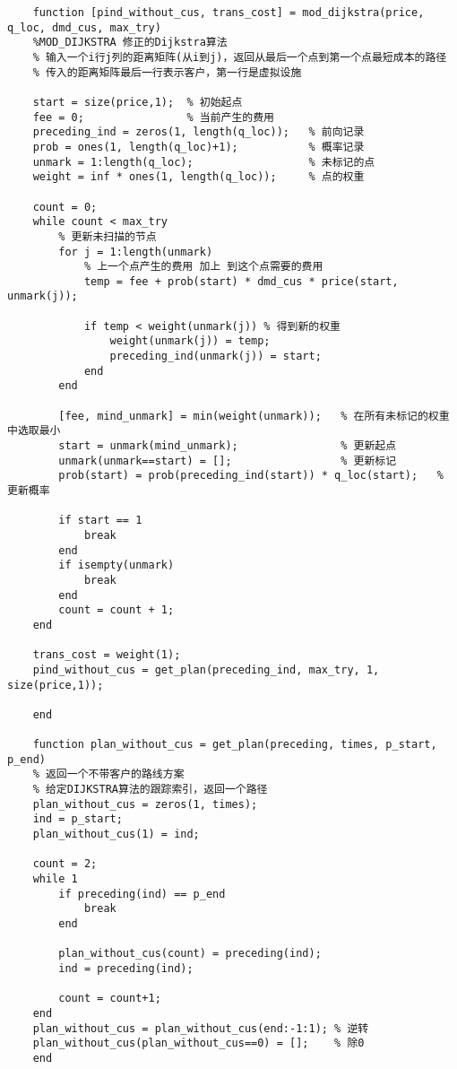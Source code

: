 {\begin{lstlisting}
    function [pind_without_cus, trans_cost] = mod_dijkstra(price, q_loc, dmd_cus, max_try)
    %MOD_DIJKSTRA 修正的Dijkstra算法
    % 输入一个i行j列的距离矩阵(从i到j)，返回从最后一个点到第一个点最短成本的路径
    % 传入的距离矩阵最后一行表示客户，第一行是虚拟设施

    start = size(price,1);  % 初始起点
    fee = 0;                % 当前产生的费用
    preceding_ind = zeros(1, length(q_loc));   % 前向记录
    prob = ones(1, length(q_loc)+1);           % 概率记录
    unmark = 1:length(q_loc);                  % 未标记的点
    weight = inf * ones(1, length(q_loc));     % 点的权重

    count = 0;
    while count < max_try
        % 更新未扫描的节点
        for j = 1:length(unmark)
            % 上一个点产生的费用 加上 到这个点需要的费用
            temp = fee + prob(start) * dmd_cus * price(start, unmark(j));

            if temp < weight(unmark(j)) % 得到新的权重
                weight(unmark(j)) = temp;
                preceding_ind(unmark(j)) = start; 
            end
        end

        [fee, mind_unmark] = min(weight(unmark));   % 在所有未标记的权重中选取最小
        start = unmark(mind_unmark);                % 更新起点
        unmark(unmark==start) = [];                 % 更新标记
        prob(start) = prob(preceding_ind(start)) * q_loc(start);   % 更新概率
        
        if start == 1
            break
        end
        if isempty(unmark)
            break
        end
        count = count + 1;
    end

    trans_cost = weight(1);
    pind_without_cus = get_plan(preceding_ind, max_try, 1, size(price,1));

    end

    function plan_without_cus = get_plan(preceding, times, p_start, p_end)
    % 返回一个不带客户的路线方案
    % 给定DIJKSTRA算法的跟踪索引，返回一个路径
    plan_without_cus = zeros(1, times);
    ind = p_start;
    plan_without_cus(1) = ind;

    count = 2;
    while 1
        if preceding(ind) == p_end
            break
        end

        plan_without_cus(count) = preceding(ind);
        ind = preceding(ind);

        count = count+1;
    end
    plan_without_cus = plan_without_cus(end:-1:1); % 逆转
    plan_without_cus(plan_without_cus==0) = [];    % 除0
    end


\end{lstlisting}}
